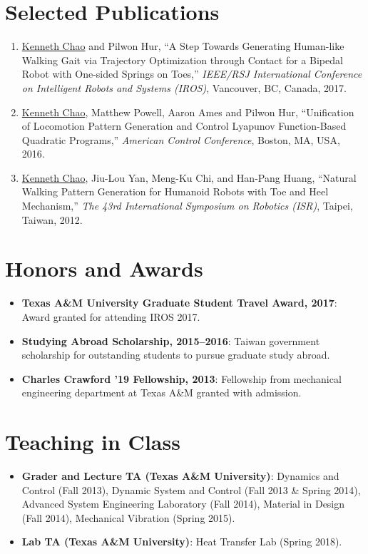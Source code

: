 \documentclass[letterpaper,11pt]{article}
\newcommand{\resumeItem}[2]{
  \item\small{
    \textbf{#1}{: #2 \vspace{-2pt}}
  }
}
\newcommand{\resumeNumItem}[1]{
  \item\small{
    {#1 \vspace{-2pt}}
  }
}
\newcommand{\resumeSubItem}[2]{\resumeItem{#1}{#2}\vspace{-4pt}}
\newcommand{\resumeSubHeadingListStart}{\begin{itemize}[leftmargin=*]}
\newcommand{\resumeSubHeadingListEnd}{\end{itemize}}
\newcommand{\resumeNumItemListStart}{\begin{enumerate}}
\newcommand{\resumeNumItemListEnd}{\end{enumerate}\vspace{-5pt}}
\begin{document}
\section{Selected Publications}
  \resumeNumItemListStart
\resumeNumItem
{\underline{Kenneth Chao} and Pilwon Hur, ``A Step Towards Generating Human-like Walking Gait via Trajectory Optimization through Contact for a Bipedal Robot with One-sided Springs on Toes,''  \textit{IEEE/RSJ International Conference on Intelligent Robots and Systems (IROS)}, Vancouver, BC, Canada, 2017.}  
  
\resumeNumItem
{\underline{Kenneth Chao}, Matthew Powell, Aaron Ames and Pilwon Hur, ``Unification of Locomotion Pattern Generation and Control Lyapunov Function-Based Quadratic Programs,''
             	\textit{American Control Conference},
             	Boston, MA, USA, 2016.}
\resumeNumItem
{\underline{Kenneth Chao}, Jiu-Lou Yan, Meng-Ku Chi, and Han-Pang Huang,
	``Natural Walking Pattern Generation for Humanoid Robots with Toe and Heel Mechanism,''
	\textit{The 43rd International Symposium on Robotics (ISR)},
	Taipei, Taiwan,
2012.}
%    	
  \resumeNumItemListEnd


\section{Honors and Awards}
  \resumeSubHeadingListStart
        \resumeSubItem{Texas A\&M University Graduate Student Travel Award, 2017}
        {Award granted for attending IROS 2017.}     
      \resumeSubItem{Studying Abroad Scholarship, 2015--2016}
      {Taiwan government scholarship for outstanding students to pursue graduate study abroad.}
      \resumeSubItem{Charles Crawford '19 Fellowship, 2013}
      {Fellowship from mechanical engineering department at Texas A\&M granted with admission.}
  \resumeSubHeadingListEnd
\section{Teaching in Class}
  \resumeSubHeadingListStart
      \resumeSubItem{Grader and Lecture TA (Texas A\&M University)}
      {Dynamics and Control (Fall 2013), Dynamic System and Control (Fall 2013 \& Spring 2014), Advanced System  Engineering Laboratory (Fall 2014), Material in Design (Fall 2014), Mechanical Vibration (Spring 2015).}
      \resumeSubItem{Lab TA (Texas A\&M University)}
      {Heat Transfer Lab (Spring 2018).}      
  \resumeSubHeadingListEnd
\end{document}
